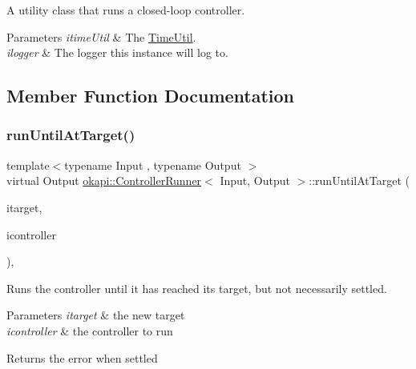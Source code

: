 A utility class that runs a closed-\/loop controller.


\begin{DoxyParams}{Parameters}
{\em itime\+Util} & The \mbox{\hyperlink{classokapi_1_1TimeUtil}{Time\+Util}}. \\
\hline
{\em ilogger} & The logger this instance will log to. \\
\hline
\end{DoxyParams}


\subsection{Member Function Documentation}
\mbox{\label{classokapi_1_1ControllerRunner_ab1e85de9c843d4b946f3d8672bf47f51}} 
\subsubsection{\texorpdfstring{runUntilAtTarget()}{runUntilAtTarget()}\hspace{0.1cm}{\footnotesize\ttfamily [1/2]}}
{\footnotesize\ttfamily template$<$typename Input , typename Output $>$ \\
virtual Output \mbox{\hyperlink{classokapi_1_1ControllerRunner}{okapi\+::\+Controller\+Runner}}$<$ Input, Output $>$\+::run\+Until\+At\+Target (\begin{DoxyParamCaption}\item[{const Input}]{itarget,  }\item[{\mbox{\hyperlink{classokapi_1_1AsyncController}{Async\+Controller}}$<$ Input, Output $>$ \&}]{icontroller }\end{DoxyParamCaption})\hspace{0.3cm}{\ttfamily [inline]}, {\ttfamily [virtual]}}

Runs the controller until it has reached its target, but not necessarily settled.


\begin{DoxyParams}{Parameters}
{\em itarget} & the new target \\
\hline
{\em icontroller} & the controller to run \\
\hline
\end{DoxyParams}
\begin{DoxyReturn}{Returns}
the error when settled 
\end{DoxyReturn}
\mbox{\label{classokapi_1_1ControllerRunner_af9654dd06bf58274b7cbcfd84813193a}} 
